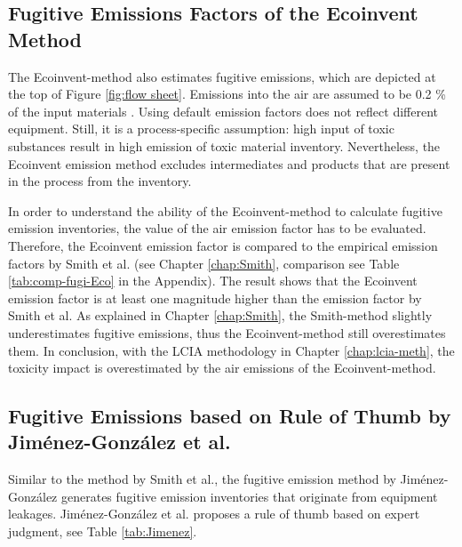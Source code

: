 \subsection{Fugitive Emissions Factors of the Ecoinvent Method}
\label{gendorf-emission}
The Ecoinvent-method also estimates fugitive emissions, which are depicted at the top of Figure \ref{fig:flow sheet}. Emissions into the air are assumed to be 0.2 \% of the input materials %
 \cite{Hischier.2005, Althaus.2007}.%
Using default emission factors does not reflect different equipment. Still, it is a process-specific assumption: high input of toxic substances result in high emission of toxic material inventory. Nevertheless, the Ecoinvent emission method excludes intermediates and products that are present in the process from the inventory.

In order to understand the ability of the Ecoinvent-method to calculate fugitive emission inventories,
the value of the air emission factor has to be evaluated. Therefore, the Ecoinvent emission factor is compared to the empirical emission factors by Smith et al. \cite{Smith.2017} (see Chapter \ref{chap:Smith}, comparison see Table \ref{tab:comp-fugi-Eco} in the Appendix). The result shows that the Ecoinvent emission factor is at least one magnitude higher than the emission factor by Smith et al. As explained in Chapter \ref{chap:Smith}, the Smith-method slightly underestimates fugitive emissions, thus the Ecoinvent-method still overestimates them. In conclusion, with the LCIA methodology in Chapter \ref{chap:lcia-meth}, the toxicity impact is overestimated by the air emissions of the Ecoinvent-method.


\subsection{Fugitive Emissions based on Rule of Thumb by Jiménez-González et al. \cite{JimenezGonzalez.2000}}
Similar to the method by Smith et al., the fugitive emission method by Jiménez-González generates fugitive emission inventories that originate from equipment leakages. Jiménez-González et al. \cite{JimenezGonzalez.2000} proposes a rule of thumb based on expert judgment, see Table \ref{tab:Jimenez}.

